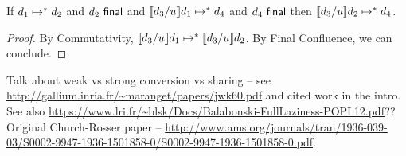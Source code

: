 \begin{theorem}[Resumption]
  If $d_1 \mapsto^* d_2$
  and $d_2~\mathsf{final}$
  and $\llbracket d_3 / u\rrbracket d_1 \mapsto^* d_4$
  and $d_4~\mathsf{final}$
  then $\llbracket d_3 / u\rrbracket d_2 \mapsto^* d_4$.
  \begin{proof}
    By Commutativity,
    $\llbracket d_3 / u\rrbracket d_1 \mapsto^* \llbracket d_3 / u\rrbracket d_2$.
    By Final Confluence, we can conclude.
  \end{proof}
\end{theorem}

Talk about weak vs strong conversion vs sharing -- see \url{http://gallium.inria.fr/~maranget/papers/jwk60.pdf} and cited work in the intro. See also \url{https://www.lri.fr/~blsk/Docs/Balabonski-FullLaziness-POPL12.pdf}?? Original Church-Rosser paper -- \url{http://www.ams.org/journals/tran/1936-039-03/S0002-9947-1936-1501858-0/S0002-9947-1936-1501858-0.pdf}.


\begin{comment}

\begin{theorem}[Maximum Informativity]
If the expansion produces $t1$, and there exists another possible type choice
$t2$, then $t1 \sim t2$ and $t1 JOIN t2 = t1$
\end{theorem}\footnote{idea is that special casing the holes in EANEHole gives you ``the
most descriptive hole types'' for some sense of what that means -- they'd
all just be hole other wise. from Matt:
\begin{quote}
It sounds like we need a something akin to an abstract domain (a lattice),
where hole has the least information, and a fully-defined type (without
holes) has the most information.  You can imagine that this lattice really
expands the existing definition we have of type consistency, which is
merely the predicate that says whether two types are comparable
(“join-able”) in this lattice.  lattice join is the operation that goes
through the structure of two (consistent) types, and chooses the structure
that is more defined (i.e., non-hole, if given the choice between hole and
non-hole).

The rule choosenonhole below is the expansion of this consistency rule that
we already have (hole consistent with everything)
\end{quote}}

\begin{verbatim}
t not hole
-------------------- :: choose-non-hole
hole JOIN t  = t
\end{verbatim}
\begin{verbatim}
------------ :: hole-consistent-with-everything
hole ~ t
\end{verbatim}

\end{comment}
